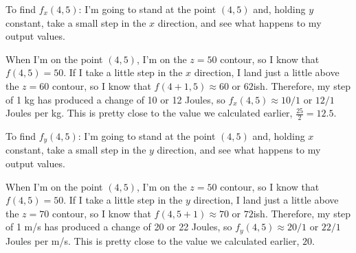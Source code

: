 \documentclass[10pt]{article}
\newenvironment{red}{\color{red}}{\ignorespacesafterend}
\begin{document}
\begin{enumerate}[leftmargin=0pt]
\begin{enumerate}
        \begin{red}
            To find $f_x(4,5)$: I'm going to stand at the point $(4,5)$ and, holding $y$ constant, take a small step in the $x$ direction, and see what happens to my output values.
            
            When I'm on the point $(4,5)$, I'm on the $z = 50$ contour, so I know that $f(4,5) = 50$. If I take a little step in the $x$ direction, I land just a little above the $z = 60$ contour, so I know that $f(4+1, 5) \approx 60$ or $62$ish. Therefore, my step of 1 kg has produced a change of 10 or 12 Joules, so $f_x(4,5) \approx 10/1$ or $12/1$ Joules per kg. This is pretty close to the value we calculated earlier, $\tfrac{25}{2} = 12.5$.
            
            To find $f_y(4,5)$: I'm going to stand at the point $(4,5)$ and, holding $x$ constant, take a small step in the $y$ direction, and see what happens to my output values.
            
            When I'm on the point $(4,5)$, I'm on the $z = 50$ contour, so I know that $f(4,5) = 50$. If I take a little step in the $y$ direction, I land just a little above the $z = 70$ contour, so I know that $f(4, 5+1) \approx 70$ or $72$ish. Therefore, my step of 1 m/s has produced a change of 20 or 22 Joules, so $f_y(4,5) \approx 20/1$ or $22/1$ Joules per m/s. This is pretty close to the value we calculated earlier, $20$.
            
            
        \end{red}
    \end{enumerate}

\end{enumerate}
\end{document}
